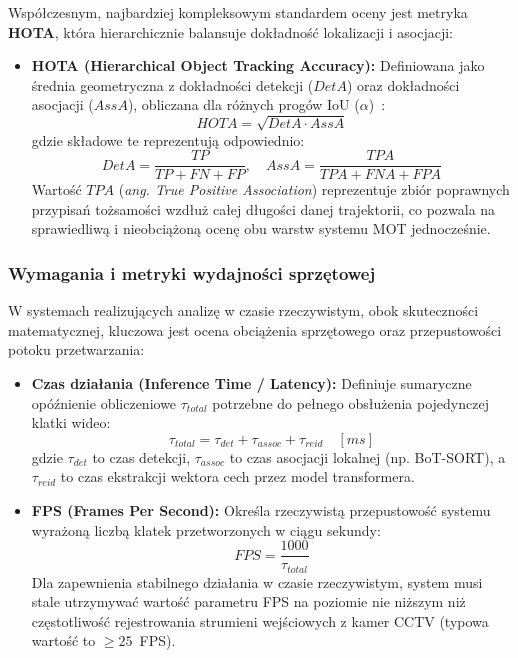Współczesnym, najbardziej kompleksowym standardem oceny jest metryka \textbf{HOTA}, która
hierarchicznie balansuje dokładność lokalizacji i asocjacji:

\begin{itemize}
  \item \textbf{HOTA (Hierarchical Object Tracking Accuracy):} Definiowana jako średnia geometryczna z dokładności detekcji ($DetA$) oraz dokładności asocjacji ($AssA$), obliczana dla różnych progów IoU ($\alpha$)~\cite{luiten2021hota}:
        \begin{equation}
          HOTA = \sqrt{DetA \cdot AssA}
        \end{equation}
        gdzie składowe te reprezentują odpowiednio:
        \begin{equation}
          DetA = \frac{TP}{TP + FN + FP}, \quad AssA = \frac{TPA}{TPA + FNA + FPA}
        \end{equation}
        Wartość $TPA$ (\textit{ang. True Positive Association}) reprezentuje zbiór poprawnych przypisań tożsamości wzdłuż całej długości danej trajektorii, co pozwala na sprawiedliwą i nieobciążoną ocenę obu warstw systemu MOT jednocześnie.
\end{itemize}

\subsubsection{Wymagania i metryki wydajności sprzętowej}

W systemach realizujących analizę w czasie rzeczywistym, obok skuteczności matematycznej, kluczowa
jest ocena obciążenia sprzętowego oraz przepustowości potoku przetwarzania:

\begin{itemize}
  \item \textbf{Czas działania (Inference Time / Latency):} Definiuje sumaryczne opóźnienie obliczeniowe $\tau_{total}$ potrzebne do pełnego obsłużenia pojedynczej klatki wideo:
        \begin{equation}
          \tau_{total} = \tau_{det} + \tau_{assoc} + \tau_{reid} \quad [ms]
        \end{equation}
        gdzie $\tau_{det}$ to czas detekcji, $\tau_{assoc}$ to czas asocjacji lokalnej (np. BoT-SORT), a $\tau_{reid}$ to czas ekstrakcji wektora cech przez model transformera.

  \item \textbf{FPS (Frames Per Second):} Określa rzeczywistą przepustowość systemu wyrażoną liczbą klatek przetworzonych w ciągu sekundy:
        \begin{equation}
          FPS = \frac{1000}{\tau_{total}}
        \end{equation}
        Dla zapewnienia stabilnego działania w czasie rzeczywistym, system musi stale utrzymywać wartość parametru FPS na poziomie nie niższym niż częstotliwość rejestrowania strumieni wejściowych z kamer CCTV (typowa wartość to $\ge 25$~FPS).
\end{itemize}

